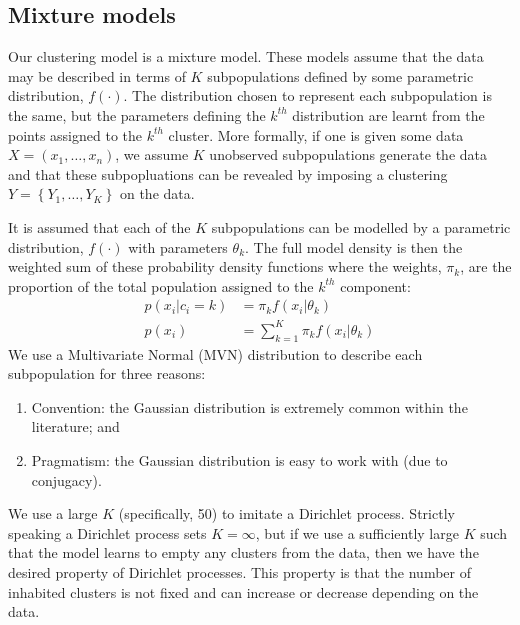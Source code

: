 \documentclass[12pt]{article} %
\begin{document}
	\subsection{Mixture models} \label{mixture_models}
	Our clustering model is a mixture model. These models assume that the data may be described in terms of $K$ subpopulations defined by some parametric distribution, $f(\cdot)$. The distribution chosen to represent each subpopulation is the same, but the parameters defining the $k^{th}$ distribution are learnt from the points assigned to the $k^{th}$ cluster. More formally, if one is given some data $X = (x_1, \ldots, x_n)$, we assume $K$ unobserved subpopulations generate the data and that these subpopluations can be revealed by imposing a clustering $Y = \left\{Y_1,\ldots,Y_K\right\}$ on the data.
	
	It is assumed that each of the $K$ subpopulations can be modelled by a parametric distribution, $f(\cdot)$ with parameters $\theta_k$. The full model density is then the weighted sum of these probability density functions where the weights, $\pi_k$, are the proportion of the total population assigned to the $k^{th}$ component:
	\begin{align}
	p(x_i|c_i = k) &= \pi_k f(x_i | \theta_k) \\
	p(x_i) &= \sum_{k=1}^K \pi_k f(x_i | \theta_k)
	\end{align}
	We use a Multivariate Normal (MVN) distribution to describe each subpopulation for three reasons:
	\begin{enumerate}
		\item Convention: the Gaussian distribution is extremely common within the literature; and
		\item Pragmatism: the Gaussian distribution is easy to work with (due to conjugacy).
	\end{enumerate}
	We use a large $K$ (specifically, 50) to imitate a Dirichlet process. Strictly speaking a Dirichlet process sets $K=\infty$, but if we use a sufficiently large $K$ such that the model learns to empty any clusters from the data, then we have the desired property of Dirichlet processes. This property is that the number of inhabited clusters is not fixed and can increase or decrease depending on the data.
	
\end{document}
